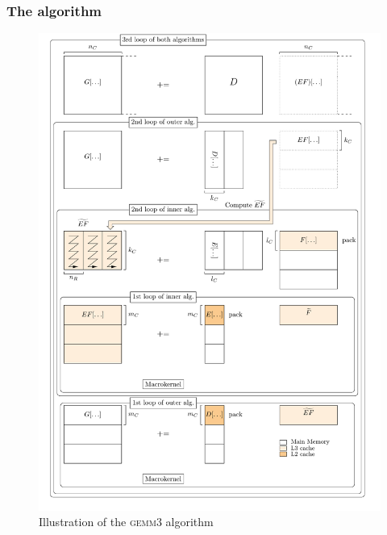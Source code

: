 \documentclass{beamer}
\newcommand*{\gemmt}{{\textsc{gemm3}}}
\begin{document}
\begin{frame}
  \frametitle{The algorithm}
  \begin{figure}
    \centering
    \includegraphics[height=0.875\textheight]{gemm3-picture}
    \caption{Illustration of the \gemmt{} algorithm}
    \label{fig:gemm3}
\end{figure}
\end{frame}
\end{document}
